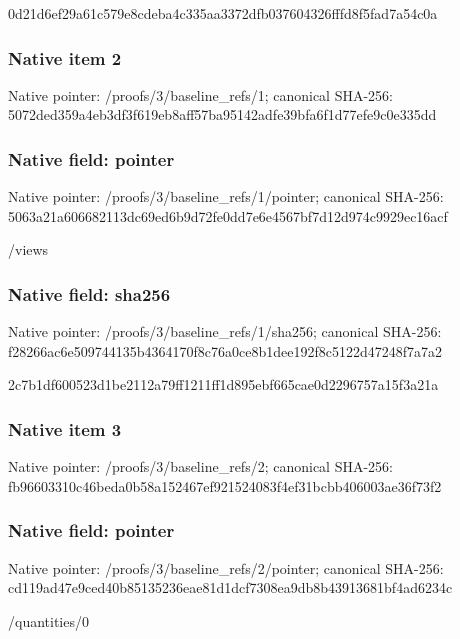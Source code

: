 \documentclass[10pt,a4paper]{article}
\begin{document}
\begingroup\raggedright\sloppy 0d21d6ef29a61c579e8cdeba4c335aa3372dfb037604326fffd8f5fad7a54c0a\par\endgroup

\subsubsection{Native item 2}
Native pointer: /proofs/3/baseline\_\allowbreak{}refs/1; canonical SHA-256: 5072ded359a4eb3df3f619eb8aff57ba95142adfe39bfa6f1d77efe9c0e335dd

\subsubsection{Native field: pointer}
Native pointer: /proofs/3/baseline\_\allowbreak{}refs/1/pointer; canonical SHA-256: 5063a21a606682113dc69ed6b9d72fe0dd7e6e4567bf7d12d974c9929ec16acf

\begingroup\raggedright\sloppy /\allowbreak{}views\par\endgroup

\subsubsection{Native field: sha256}
Native pointer: /proofs/3/baseline\_\allowbreak{}refs/1/sha256; canonical SHA-256: f28266ac6e509744135b4364170f8c76a0ce8b1dee192f8c5122d47248f7a7a2

\begingroup\raggedright\sloppy 2c7b1df600523d1be2112a79ff1211ff1d895ebf665cae0d2296757a15f3a21a\par\endgroup

\subsubsection{Native item 3}
Native pointer: /proofs/3/baseline\_\allowbreak{}refs/2; canonical SHA-256: fb96603310c46beda0b58a152467ef921524083f4ef31bcbb406003ae36f73f2

\subsubsection{Native field: pointer}
Native pointer: /proofs/3/baseline\_\allowbreak{}refs/2/pointer; canonical SHA-256: cd119ad47e9ced40b85135236eae81d1dcf7308ea9db8b43913681bf4ad6234c

\begingroup\raggedright\sloppy /\allowbreak{}quantities/\allowbreak{}0\par\endgroup
\end{document}
